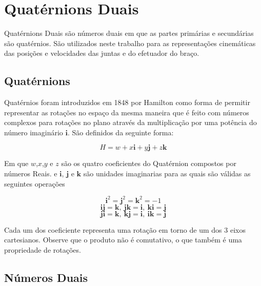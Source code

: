 \section{Quatérnions Duais}

Quatérnions Duais são números duais em que as partes primárias e secundárias são quatérnios. São utilizados neste trabalho para as representações cinemáticas das posições e velocidades das juntas e do efetuador do braço.

\subsection{Quatérnions}
Quatérnios foram introduzidos em 1848 por Hamilton \cite{hamilton1848xi} como forma de permitir representar as rotações no espaço da mesma maneira que é feito com números complexos para rotações no plano através da multiplicação por uma potência do número imaginário $\mathbf{i}$. São definidos da seguinte forma:

\begin{equation}
    H = w + x\mathbf{{i}} + y\mathbf{{j}} + z\mathbf{{k}}
\end{equation}

Em que $w$,$x$,$y$ e $z$ são os quatro coeficientes do Quatérnion compostos por números Reais. e $\mathbf{{i}}$, $\mathbf{{j}}$ e $\mathbf{{k}}$ são unidades imaginarias para as quais são válidas as seguintes operações

\begin{equation}
    \mathbf{{i}}^2 = \mathbf{{j}}^2 = \mathbf{{k}}^2 = -1
\end{equation}
\begin{equation}
    \mathbf{i}\mathbf{j} = \mathbf{k},\ \mathbf{j}\mathbf{k} = \mathbf{i},\ \mathbf{k}\mathbf{i} = \mathbf{j}
\end{equation}
\begin{equation}
    \mathbf{j}\mathbf{i} = \mathbf{k},\ \mathbf{k}\mathbf{j} = \mathbf{i},\ \mathbf{i}\mathbf{k} = \mathbf{j}
\end{equation}

Cada um dos coeficiente representa uma rotação em torno de um dos 3 eixos cartesianos. Observe que o produto não é comutativo, o que também é uma propriedade de rotações.

\subsection{Números Duais}

